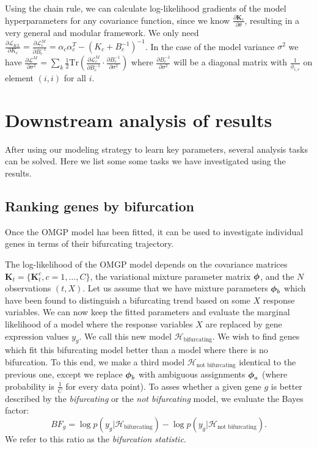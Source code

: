 Using the chain rule, we can calculate log-likelihood gradients of the model hyperparameters for any covariance function, since we know $ \frac{\partial \bm{K}_c}{\partial \mathbb{\theta}} $, resulting in a very general and modular framework. We only need
$ \frac{\partial \mathcal{L}_{KL}}{\partial K_c} =
\frac{\partial \mathcal{L}^{M}_c}{\partial B_c^{-1}} =
\alpha_c \alpha_c^T  - (K_c + B_c^{-1})^{-1} $.
In the case of the model variance $ \sigma^2 $ we have
$ \frac{\partial \mathcal{L}^{M}}{\partial \sigma^2} =
\sum_k \frac{1}{2} \text{Tr} \left( \frac{\partial \mathcal{L}^{M}_c}{\partial B_c^{-1}} \cdot
\frac{\partial B_c^{-1}}{\partial \sigma^2} \right) $
where $ \frac{\partial B_c^{-1}}{\partial \sigma^2} $ will be a diagonal matrix with
$ \frac{1}{\phi_{i, c}} $ on element $ (i, i) $ for all $ i $.

\section{Downstream analysis of  results} \label{sec:downstream}

After using our modeling strategy to learn key parameters, several analysis tasks can be solved. Here we list some some tasks we have investigated using the results.

\subsection{Ranking genes by bifurcation}

Once the OMGP model has been fitted, it can be used to investigate individual genes in terms of their bifurcating trajectory.

The log-likelihood of the OMGP model depends on the covariance matrices $ \mathbf{K}_t = \{ \bm{K}^c_t, c=1, \ldots, C\} $, the variational mixture parameter matrix $ \mbox{\boldmath $\phi$} $, and the $ N $ observations $ (t, X) $. Let us assume that we have mixture parameters $ \mbox{\boldmath $\phi$}_{b} $ which have been found to distinguish a bifurcating trend based on some $ X $ response variables. We can now keep the fitted parameters and evaluate the marginal likelihood of a model where the response variables $ X $ are replaced by gene expression values $ y_g $. We call this new model $ \mathcal{H}_\text{bifurcating} $. We wish to find genes which fit this bifurcating model better than a model where there is no bifurcation. To this end, we make a third model $ \mathcal{H}_\text{not bifurcating} $ identical to the previous one, except we replace $ \mbox{\boldmath $\phi$}_{b} $ with ambiguous assignments $ \mbox{\boldmath $\phi$}_a $ (where probability is \( \frac{1}{C} \) for every data point). To asses whether a given gene $ g $ is better described by the \textit{bifurcating} or the \textit{not bifurcating} model, we evaluate the Bayes factor:
$$
BF_{g} = \log p(y_g | \mathcal{H}_\text{bifurcating}) - \log p(y_g | \mathcal{H}_\text{not bifurcating}).
$$
We refer to this ratio as the \textit{bifurcation statistic}.

